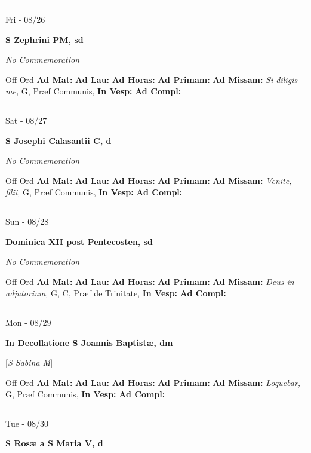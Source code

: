 \documentclass[letterpaper, 10pt]{article}
\begin{document}
\hrule
\begin{center}
Fri - 08/26
\end{center}\textbf{ \large S Zephrini PM, \textnormal{\normalsize sd}}

\textit{No Commemoration}\begin{justify}
Off Ord
\textbf{Ad Mat: }
\textbf{Ad Lau: }
\textbf{Ad Horas: }
\textbf{Ad Primam: }
\textbf{Ad Missam:} \textit{Si diligis me, } G, Præf Communis, 
\textbf{In Vesp: }
\textbf{Ad Compl: }\end{justify}



\hrule
\begin{center}
Sat - 08/27
\end{center}\textbf{ \large S Josephi Calasantii C, \textnormal{\normalsize d}}

\textit{No Commemoration}\begin{justify}
Off Ord
\textbf{Ad Mat: }
\textbf{Ad Lau: }
\textbf{Ad Horas: }
\textbf{Ad Primam: }
\textbf{Ad Missam:} \textit{Venite, filii, } G, Præf Communis, 
\textbf{In Vesp: }
\textbf{Ad Compl: }\end{justify}



\hrule
\begin{center}
Sun - 08/28
\end{center}\textbf{ \large Dominica XII post Pentecosten, \textnormal{\normalsize sd}}

\textit{No Commemoration}\begin{justify}
Off Ord
\textbf{Ad Mat: }
\textbf{Ad Lau: }
\textbf{Ad Horas: }
\textbf{Ad Primam: }
\textbf{Ad Missam:} \textit{Deus in adjutorium, } G, C, Præf de Trinitate, 
\textbf{In Vesp: }
\textbf{Ad Compl: }\end{justify}



\hrule
\begin{center}
Mon - 08/29
\end{center}\textbf{ \large In Decollatione S Joannis Baptistæ, \textnormal{\normalsize dm}}

[\textit{S Sabina M}]
\begin{justify}
Off Ord
\textbf{Ad Mat: }
\textbf{Ad Lau: }
\textbf{Ad Horas: }
\textbf{Ad Primam: }
\textbf{Ad Missam:} \textit{Loquebar, } G, Præf Communis, 
\textbf{In Vesp: }
\textbf{Ad Compl: }\end{justify}



\hrule
\begin{center}
Tue - 08/30
\end{center}\textbf{ \large S Rosæ a S Maria V, \textnormal{\normalsize d}}
\end{document}

